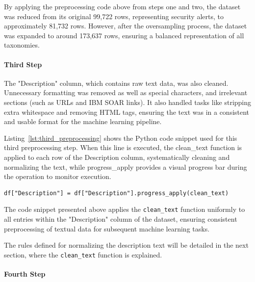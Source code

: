 By applying the preprocessing code above from steps one and two, the dataset was reduced from its original 99,722 rows, representing security alerts, to approximately 81,732 rows.
However, after the oversampling process, the dataset was expanded to around 173,637 rows, ensuring a balanced representation of all taxonomies.

\paragraph{Third Step}

The "Description" column, which contains raw text data, was also cleaned. 
Unnecessary formatting was removed as well as special characters, and irrelevant sections (such as URLs and IBM SOAR links). 
It also handled tasks like stripping extra whitespace and removing HTML tags, ensuring the text was in a consistent and usable format for the machine learning pipeline.

Listing~\ref{lst:third_preprocessing} shows the Python code snippet used for this third preprocessing step.
When this line is executed, the clean\_text function is applied to each row of the Description column, systematically cleaning and normalizing the text, while progress\_apply provides a visual progress bar during the operation to monitor execution.

\vspace{0.2cm}
\noindent
\begin{minipage}{\linewidth}
\begin{verbatim}
df["Description"] = df["Description"].progress_apply(clean_text)
\end{verbatim}
\label{lst:third_preprocessing}
\end{minipage}
\vspace{0.1cm}

The code snippet presented above applies the \texttt{clean\_text} function uniformly to all entries within the "Description" column of the dataset, ensuring consistent preprocessing of textual data for subsequent machine learning tasks.

The rules defined for normalizing the description text will be detailed in the next section, where the \texttt{clean\_text} function is explained.

\paragraph{Fourth Step}


